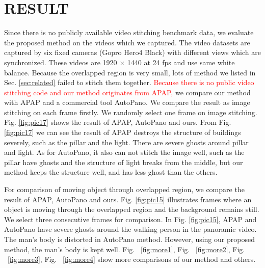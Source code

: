 \documentclass[conference]{IEEEtran}
\begin{document}
\section{RESULT}
\label{sec:result}

Since there is no publicly available video stitching benchmark data, we evaluate the proposed method on the 
videos which we captured.  The video datasets are captured by six fixed cameras (Gopro Hero4 Black) with different views which are synchronized. 
These videos are 1920 $\times$ 1440 at 24 fps and use same white balance.
Because the overlapped region is very small, lots of method we listed in Sec. \ref{sec:related} failed to stitch them together.
\textcolor{red}{Because there is no public video stitching code and our method originates from APAP,}
we compare our method with APAP and a commercial tool AutoPano. We compare the result as image stitching on each frame firstly.
We randomly select one frame on image stitching. Fig. \ref{fig:pic17} shows the result of APAP, AutoPano and ours. 
From Fig. \ref{fig:pic17} we can see the result of APAP 
destroys the structure of buildings severely, such as the pillar and the light. There are severe ghosts around pillar and light.
As for AutoPano, it also can not stitch the image well, such as the pillar have ghosts and the structure of light breaks from the middle, 
but our method keeps the structure well, and has less ghost than the others.

For comparison of moving object through overlapped region, we compare the result of APAP, AutoPano and ours. Fig. \ref{fig:pic15} 
illustrates frames where an object is moving through the overlapped region and the background remains still. 
We select three consecutive frames for comparison. In Fig. \ref{fig:pic15}, APAP and AutoPano have severe ghosts around the walking person in the panoramic video. 
The man's body is distorted in AutoPano method. However, using our proposed method, the man's body is kept well. 
Fig. ~\ref{fig:more1}, Fig. ~\ref{fig:more2}, Fig. ~\ref{fig:more3}, Fig. ~\ref{fig:more4} show more comparisons of our method and others.
\end{document}

